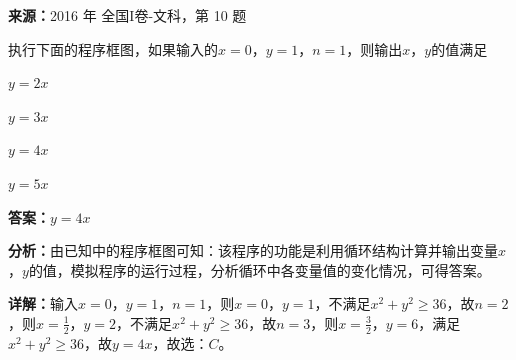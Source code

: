 \begin{question}[points=5]
\textbf{来源：}2016 年 全国I卷-文科，第 10 题\par
执行下面的程序框图，如果输入的$x=0$，$y=1$，$n=1$，则输出$x$，$y$的值满足
\begin{choices}
  \item $y=2x$
  \item $y=3x$
  \item $y=4x$
  \item $y=5x$
\end{choices}
\begin{solution}
\textbf{答案：}$y=4x$

\textbf{分析：}由已知中的程序框图可知：该程序的功能是利用循环结构计算并输出变量$x$，$y$的值，模拟程序的运行过程，分析循环中各变量值的变化情况，可得答案。

\textbf{详解：}输入$x=0$，$y=1$，$n=1$，则$x=0$，$y=1$，不满足$x^2+y^2\ge36$，故$n=2$，则$x=\frac{1}{2}$，$y=2$，不满足$x^2+y^2\ge36$，故$n=3$，则$x=\frac{3}{2}$，$y=6$，满足$x^2+y^2\ge36$，故$y=4x$，故选：$C$。
\end{solution}
\end{question}


